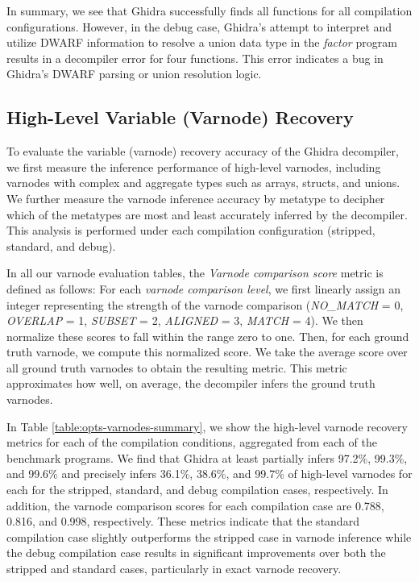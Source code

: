 \documentclass[a4paper,twoside]{article}
\begin{document}
In summary, we see that Ghidra successfully finds all functions for all compilation configurations. However, in the debug case, Ghidra's attempt to interpret and utilize DWARF information to resolve a union data type in the \emph{factor} program results in a decompiler error for four functions. This error indicates a bug in Ghidra's DWARF parsing or union resolution logic.

\subsection{High-Level Variable (Varnode) Recovery}

To evaluate the variable (varnode) recovery accuracy of the Ghidra decompiler, we first measure the inference performance of high-level varnodes, including varnodes with complex and aggregate types such as arrays, structs, and unions. We further measure the varnode inference accuracy by metatype to decipher which of the metatypes are most and least accurately inferred by the decompiler. This analysis is performed under each compilation configuration (stripped, standard, and debug).

In all our varnode evaluation tables, the \emph{Varnode comparison score} metric is defined as follows: For each \emph{varnode comparison level}, we first linearly assign an integer representing the strength of the varnode comparison (\emph{NO\_MATCH} = 0, \emph{OVERLAP} = 1, \emph{SUBSET} = 2, \emph{ALIGNED} = 3, \emph{MATCH} = 4). We then normalize these scores to fall within the range zero to one. Then, for each ground truth varnode, we compute this normalized score. We take the average score over all ground truth varnodes to obtain the resulting metric. This metric approximates how well, on average, the decompiler infers the ground truth varnodes.



In Table \ref{table:opts-varnodes-summary}, we show the high-level varnode recovery metrics for each of the compilation conditions, aggregated from each of the benchmark programs. We find that Ghidra at least partially infers 97.2\%, 99.3\%, and 99.6\% and precisely infers 36.1\%, 38.6\%, and 99.7\% of high-level varnodes for each for the stripped, standard, and debug compilation cases, respectively. In addition, the varnode comparison scores for each compilation case are 0.788, 0.816, and 0.998, respectively. These metrics indicate that the standard compilation case slightly outperforms the stripped case in varnode inference while the debug compilation case results in significant improvements over both the stripped and standard cases, particularly in exact varnode recovery.
\end{document}
